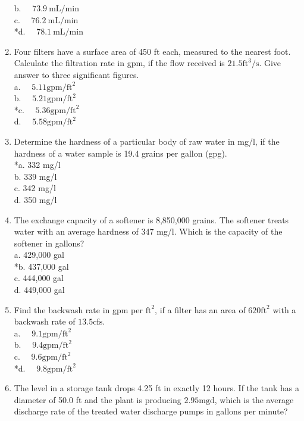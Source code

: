 \begin{enumerate}
b. $\quad 73.9 \mathrm{~mL} / \mathrm{min}$\\
c. $\quad 76.2 \mathrm{~mL} / \mathrm{min}$\\
*d. $\quad 78.1 \mathrm{~mL} / \mathrm{min}$\\
\item Four filters have a surface area of 450 ft each, measured to the nearest foot. Calculate the filtration rate in gpm, if the flow received is $21.5 \mathrm{ft}^{3} / \mathrm{s}$. Give answer to three significant figures.\\
a. $\quad 5.11 \mathrm{gpm} / \mathrm{ft}^{2}$\\
b. $\quad 5.21 \mathrm{gpm} / \mathrm{ft}^{2}$\\
*c. $\quad 5.36 \mathrm{gpm} / \mathrm{ft}^{2}$\\
d. $\quad 5.58 \mathrm{gpm} / \mathrm{ft}^{2}$\\
\item Determine the hardness of a particular body of raw water in mg/l, if the hardness of a water sample is 19.4 grains per gallon (gpg).\\
*a. 332 mg/l\\
b. 339 mg/l\\
c. 342 mg/l\\
d. 350 mg/l\\
\item The exchange capacity of a softener is 8,850,000 grains. The softener treats water with an average hardness of 347 mg/l. Which is the capacity of the softener in gallons?\\
a. 429,000 gal\\
*b. 437,000 gal\\
c. 444,000 gal\\
d. 449,000 gal\\
\item Find the backwash rate in gpm per $\mathrm{ft}^{2}$, if a filter has an area of $620 \mathrm{ft}^{2}$ with a backwash rate of $13.5 \mathrm{cfs}$.\\
a. $\quad 9.1 \mathrm{gpm} / \mathrm{ft}^{2}$\\
b. $\quad 9.4 \mathrm{gpm} / \mathrm{ft}^{2}$\\
c. $\quad 9.6 \mathrm{gpm} / \mathrm{ft}^{2}$\\
*d. $\quad 9.8 \mathrm{gpm} / \mathrm{ft}^{2}$
\item The level in a storage tank drops 4.25 ft in exactly 12 hours. If the tank has a diameter of 50.0 ft and the plant is producing $2.95 \mathrm{mgd}$, which is the average discharge rate of the treated water discharge pumps in gallons per minute?\\

\end{enumerate}
